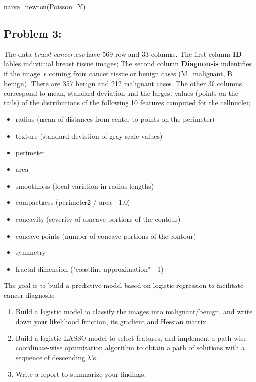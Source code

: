 \documentclass[
]{article}
\newenvironment{Shaded}{\begin{snugshade}}{\end{snugshade}}
\newcommand{\FunctionTok}[1]{\textcolor[rgb]{0.00,0.00,0.00}{#1}}
\newcommand{\NormalTok}[1]{#1}
\begin{document}
\begin{Shaded}
\begin{Highlighting}[]
\FunctionTok{naive\_newton}\NormalTok{(Poisson\_Y)}
\end{Highlighting}
\end{Shaded}

\hypertarget{problem-3}{%
\subsection{Problem 3:}\label{problem-3}}

The data \textit{breast-cancer.csv} have 569 row and 33 columns. The
first column \textbf{ID} lables individual breast tissue images; The
second column \textbf{Diagnonsis} indentifies if the image is coming
from cancer tissue or benign cases (M=malignant, B = benign). There are
357 benign and 212 malignant cases. The other 30 columns correspond to
mean, standard deviation and the largest values (points on the tails) of
the distributions of the following 10 features computed for the
cellnuclei;

\begin{itemize}
\item radius (mean of distances from center to points on the perimeter)
\item texture (standard deviation of gray-scale values)
\item perimeter
\item area
\item smoothness (local variation in radius lengths)
\item compactness (perimeter\^ 2 / area - 1.0)
\item concavity (severity of concave portions of the contour)
\item concave points (number of concave portions of the contour)
\item symmetry
\item fractal dimension ("coastline approximation" - 1)
\end{itemize}

The goal is to build a predictive model based on logistic regression to
facilitate cancer diagnosis;

\begin{enumerate}
\item Build a logistic model to classify the images into  malignant/benign, and write down your likelihood function, its gradient and Hessian matrix.  

\item Build a logistic-LASSO model to select features, and implement a path-wise coordinate-wise optimization algorithm to obtain a path of solutions with a sequence of descending $\lambda$'s. 


\item Write a report to summarize your findings.
\end{enumerate}
\end{document}
